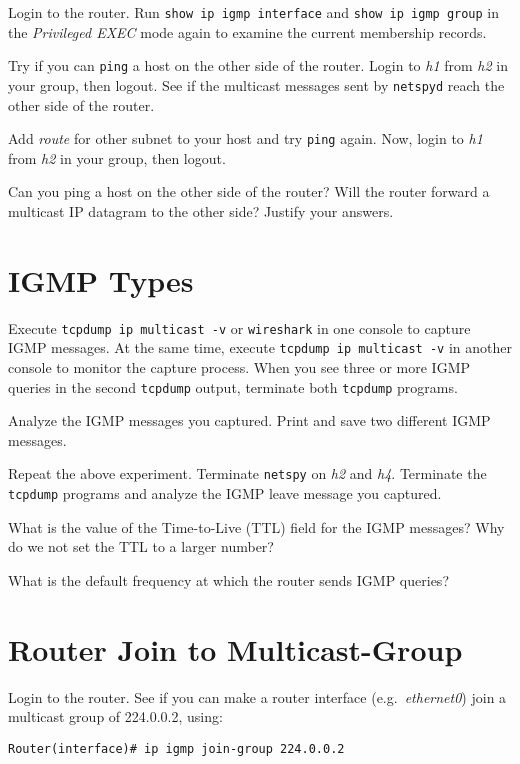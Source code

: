 \documentclass{../UTNetLab}
\begin{document}
    Login to the router.
    Run \lstinline[language={cisco}]{show ip igmp interface} and \lstinline[language={cisco}]{show ip igmp group} in the \textit{Privileged EXEC} mode again to examine the current membership records.

    Try if you can \lstinline{ping} a host on the other side of the router.
    Login to \textit{h1} from \textit{h2} in your group, then logout.
    See if the multicast messages sent by \lstinline{netspyd} reach the other side of the router.

    Add \textit{route} for other subnet to your host and try \lstinline{ping} again. Now, login to \textit{h1} from \textit{h2} in your group, then logout.
    
    \begin{report}
    \item Can you ping a host on the other side of the router?
    Will the router forward a multicast IP datagram to the other side?
    Justify your answers.
    \end{report}

\section{IGMP Types}
    Execute \lstinline{tcpdump ip multicast -v} or \lstinline{wireshark} in one console to capture IGMP messages.
    At the same time, execute \lstinline{tcpdump ip multicast -v} in another console to monitor the capture process.
    When you see three or more IGMP queries in the second \lstinline{tcpdump} output, terminate both \lstinline{tcpdump} programs.

    Analyze the IGMP messages you captured.
    Print and save two different IGMP messages.

    Repeat the above experiment.
    Terminate \lstinline{netspy} on \textit{h2} and \textit{h4}.
    Terminate the \lstinline{tcpdump} programs and analyze the IGMP leave message you captured.
    
    \begin{report}
    \item What is the value of the Time-to-Live (TTL) field for the IGMP messages?
    Why do we not set the TTL to a larger number?

    \item What is the default frequency at which the router sends IGMP queries?
    \end{report}

\section{Router Join to Multicast-Group}
    Login to the router.
    See if you can make a router interface (e.g.\ \textit{ethernet0}) join a multicast group of 224.0.0.2, using:
    \begin{lstlisting}[language={cisco}]
Router(interface)# ip igmp join-group 224.0.0.2
    \end{lstlisting}
    
\end{document}
